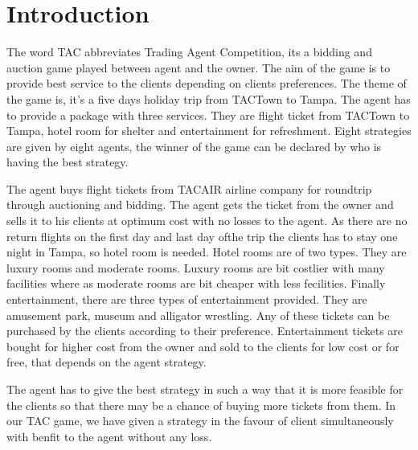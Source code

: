 \section{Introduction}


The word TAC abbreviates Trading Agent Competition, its a bidding and auction game played between agent and the owner. The aim of the game is to provide best service to the clients depending on clients preferences. The theme of the game is, it's a five days holiday trip from TACTown to Tampa. The agent has to provide a package with three services. They are flight ticket from TACTown to Tampa, hotel room for shelter and entertainment for refreshment. Eight strategies are given by  eight agents, the winner of the game can be declared by who is having the best strategy.
  
                                 The agent buys flight tickets from TACAIR airline company for roundtrip through auctioning and bidding. The agent gets the ticket from the owner and sells it to his clients at optimum cost with no losses to the agent. As there are no return flights on the first day and last day ofthe trip the clients has to stay one night in Tampa, so hotel room is needed. Hotel rooms are of two types. They are luxury rooms and moderate rooms. Luxury rooms are bit costlier with many facilities where as moderate rooms are bit cheaper with less fecilities. Finally entertainment, there are three types of entertainment provided. They are amusement park, museum and alligator wrestling. Any of these tickets can be purchased by the clients according to their preference. Entertainment tickets are bought for higher cost from the owner and sold to the clients for low cost or for free, that depends on the agent strategy. 
 

                                     The agent has to give the best strategy in such a way that it is more feasible for the clients so that there may be a chance of buying more tickets from them. In our TAC game, we have given a strategy in the favour of client simultaneously with benfit to the agent without any loss.  

